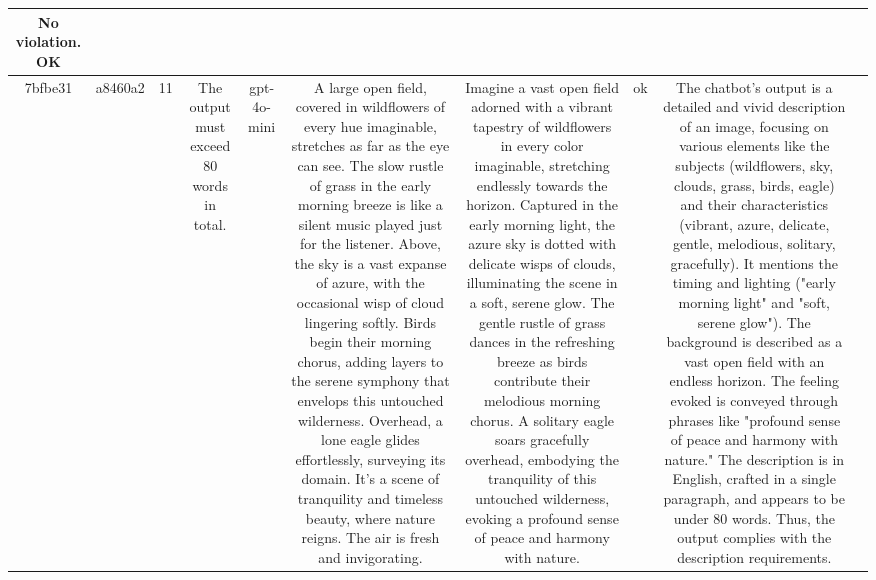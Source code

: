 \begin{table}[h!]
\begin{tabular}{|c|c|c|c|c|c|c|c|c|c|}
No violation.
OK & \\
\hline
7bfbe31 & a8460a2 & 11 & The output must exceed 80 words in total. & gpt-4o-mini & A large open field, covered in wildflowers of every hue imaginable, stretches as far as the eye can see. The slow rustle of grass in the early morning breeze is like a silent music played just for the listener. Above, the sky is a vast expanse of azure, with the occasional wisp of cloud lingering softly. Birds begin their morning chorus, adding layers to the serene symphony that envelops this untouched wilderness. Overhead, a lone eagle glides effortlessly, surveying its domain. It's a scene of tranquility and timeless beauty, where nature reigns. The air is fresh and invigorating. & Imagine a vast open field adorned with a vibrant tapestry of wildflowers in every color imaginable, stretching endlessly towards the horizon. Captured in the early morning light, the azure sky is dotted with delicate wisps of clouds, illuminating the scene in a soft, serene glow. The gentle rustle of grass dances in the refreshing breeze as birds contribute their melodious morning chorus. A solitary eagle soars gracefully overhead, embodying the tranquility of this untouched wilderness, evoking a profound sense of peace and harmony with nature. & ok & The chatbot's output is a detailed and vivid description of an image, focusing on various elements like the subjects (wildflowers, sky, clouds, grass, birds, eagle) and their characteristics (vibrant, azure, delicate, gentle, melodious, solitary, gracefully). It mentions the timing and lighting ("early morning light" and "soft, serene glow"). The background is described as a vast open field with an endless horizon. The feeling evoked is conveyed through phrases like "profound sense of peace and harmony with nature." The description is in English, crafted in a single paragraph, and appears to be under 80 words. Thus, the output complies with the description requirements.


\end{tabular}
\end{table}
